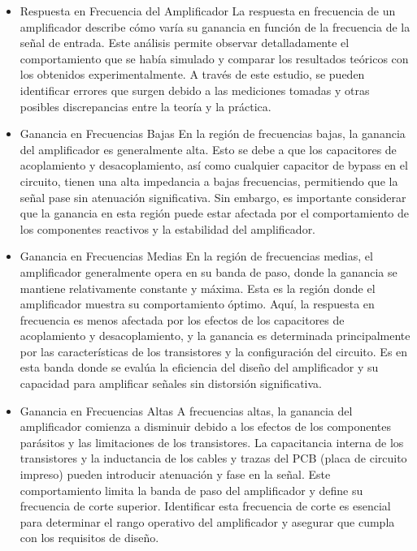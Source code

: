 \begin{itemize}
      \item Respuesta en Frecuencia del Amplificador
            La respuesta en frecuencia de un amplificador describe cómo varía su ganancia en función de la frecuencia de la señal de entrada. Este análisis permite observar detalladamente el comportamiento que se había simulado y comparar los resultados teóricos con los obtenidos experimentalmente. A través de este estudio, se pueden identificar errores que surgen debido a las mediciones tomadas y otras posibles discrepancias entre la teoría y la práctica.


      \item Ganancia en Frecuencias Bajas
            En la región de frecuencias bajas, la ganancia del amplificador es generalmente alta. Esto se debe a que los capacitores de acoplamiento y desacoplamiento, así como cualquier capacitor de bypass en el circuito, tienen una alta impedancia a bajas frecuencias, permitiendo que la señal pase sin atenuación significativa. Sin embargo, es importante considerar que la ganancia en esta región puede estar afectada por el comportamiento de los componentes reactivos y la estabilidad del amplificador.

      \item Ganancia en Frecuencias Medias
            En la región de frecuencias medias, el amplificador generalmente opera en su banda de paso, donde la ganancia se mantiene relativamente constante y máxima. Esta es la región donde el amplificador muestra su comportamiento óptimo. Aquí, la respuesta en frecuencia es menos afectada por los efectos de los capacitores de acoplamiento y desacoplamiento, y la ganancia es determinada principalmente por las características de los transistores y la configuración del circuito. Es en esta banda donde se evalúa la eficiencia del diseño del amplificador y su capacidad para amplificar señales sin distorsión significativa.

      \item Ganancia en Frecuencias Altas
            A frecuencias altas, la ganancia del amplificador comienza a disminuir debido a los efectos de los componentes parásitos y las limitaciones de los transistores. La capacitancia interna de los transistores y la inductancia de los cables y trazas del PCB (placa de circuito impreso) pueden introducir atenuación y fase en la señal. Este comportamiento limita la banda de paso del amplificador y define su frecuencia de corte superior. Identificar esta frecuencia de corte es esencial para determinar el rango operativo del amplificador y asegurar que cumpla con los requisitos de diseño.


\end{itemize}
